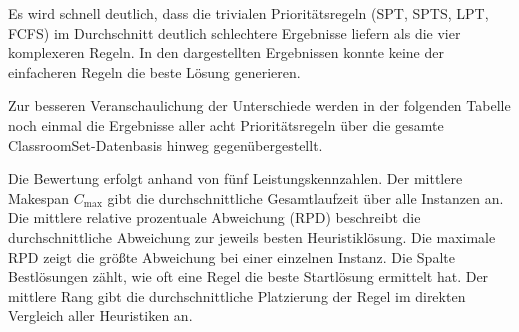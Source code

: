 Es wird schnell deutlich, dass die trivialen Prioritätsregeln (SPT, SPTS, LPT, FCFS) im Durchschnitt deutlich schlechtere Ergebnisse liefern als die vier komplexeren Regeln.
In den dargestellten Ergebnissen konnte keine der einfacheren Regeln die beste Lösung generieren.

Zur besseren Veranschaulichung der Unterschiede werden in der folgenden Tabelle noch einmal die Ergebnisse aller acht Prioritätsregeln über die gesamte ClassroomSet-Datenbasis hinweg gegenübergestellt.

Die Bewertung erfolgt anhand von fünf Leistungskennzahlen.
Der mittlere Makespan $C_{\max}$ gibt die durchschnittliche Gesamtlaufzeit über alle Instanzen an.
Die mittlere relative prozentuale Abweichung (RPD) beschreibt die durchschnittliche Abweichung zur jeweils besten Heuristiklösung.
Die maximale RPD zeigt die größte Abweichung bei einer einzelnen Instanz.
Die Spalte Bestlösungen zählt, wie oft eine Regel die beste Startlösung ermittelt hat.
Der mittlere Rang gibt die durchschnittliche Platzierung der Regel im direkten Vergleich aller Heuristiken an.

